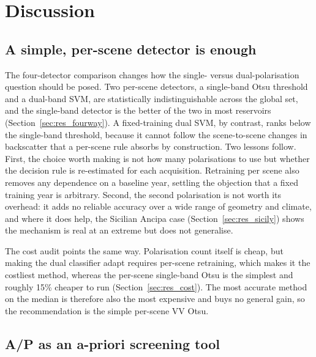 \section{Discussion}
\label{sec:discussion}

\subsection{A simple, per-scene detector is enough}

The four-detector comparison changes how the single- versus dual-polarisation
question should be posed. Two per-scene detectors, a single-band Otsu threshold
and a dual-band SVM, are statistically indistinguishable across the global set,
and the single-band detector is the better of the two in most reservoirs
(Section~\ref{sec:res_fourway}). A fixed-training dual SVM, by contrast, ranks
below the single-band threshold, because it cannot follow the scene-to-scene
changes in backscatter that a per-scene rule absorbs by construction. Two
lessons follow. First, the choice worth making is not how many polarisations to
use but whether the decision rule is re-estimated for each acquisition.
Retraining per scene also removes any dependence on a baseline year, settling
the objection that a fixed training year is arbitrary. Second, the second
polarisation is not worth its overhead: it adds no reliable accuracy over a wide
range of geometry and climate, and where it does help, the Sicilian Ancipa
case (Section~\ref{sec:res_sicily}) shows the mechanism is real at an extreme
but does not generalise.

The cost audit points the same way.
Polarisation count itself is cheap, but making the dual classifier adapt
requires per-scene retraining, which makes it the costliest method, whereas the
per-scene single-band Otsu is the simplest and roughly 15\% cheaper to run
(Section~\ref{sec:res_cost}). The most accurate method on the median is
therefore also the most expensive and buys no general gain, so the
recommendation is the simple per-scene VV Otsu.

\subsection{A/P as an a-priori screening tool}

